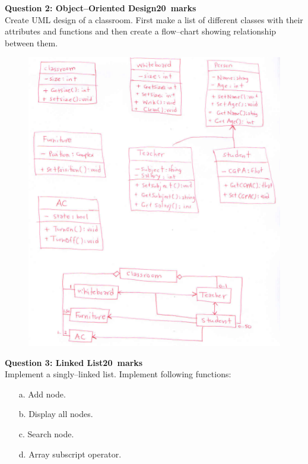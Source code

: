\documentclass[12pt,a4paper]{article}
\def\Qtwo{20}
\def\Qthree{20}
\begin{document}
\newpage
\noindent\textbf{Question 2: Object--Oriented Design\hfill \Qtwo~marks}\\
Create UML design of a classroom. First make a list of different classes with their attributes and functions and then create a flow--chart showing relationship between them.
\begin{figure}[H]
\centering
\includegraphics[scale=0.6]{UMLDiagram.png}
\end{figure}
\newpage
\noindent \textbf{Question 3: Linked List\hfill \Qthree~marks}\\
Implement a singly--linked list. Implement following functions:
\begin{itemize}
\item[a.] Add node.
\item[b.] Display all nodes.
\item[c.] Search node.
\item[d.] Array subscript operator.
\end{itemize}
\end{document}
